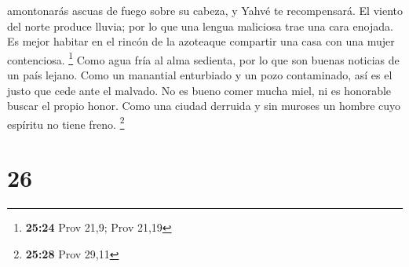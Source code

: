 amontonarás ascuas de fuego sobre su cabeza, y Yahvé te recompensará.
 El viento del norte produce lluvia; por lo que una
lengua maliciosa trae una cara enojada.  Es mejor habitar
en el rincón de la azoteaque compartir una casa con una mujer
contenciosa. \footnote{\textbf{25:24} Prov 21,9; Prov 21,19}
 Como agua fría al alma sedienta, por lo que son buenas
noticias de un país lejano.  Como un manantial enturbiado
y un pozo contaminado, así es el justo que cede ante el malvado.
 No es bueno comer mucha miel, ni es honorable buscar el
propio honor.  Como una ciudad derruida y sin muroses un
hombre cuyo espíritu no tiene freno. \footnote{\textbf{25:28} Prov 29,11}

\hypertarget{section-25}{%
\section{26}\label{section-25}}

